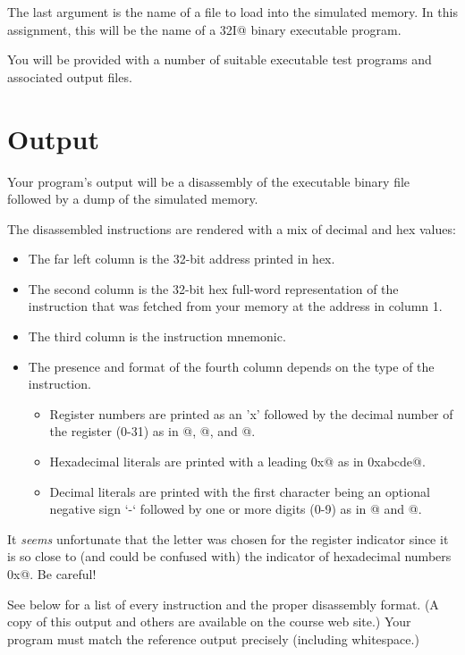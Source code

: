 \documentclass[11pt]{article}
\begin{document}
The last argument is the name of a file to load into the simulated memory. 
In this assignment, this will be the name of a \verb@RV32I@ binary executable 
program.

You will be provided with a number of suitable executable test programs and
associated output files.

\section{Output}

Your program's output will be a disassembly of the executable binary file
followed by a dump of the simulated memory.


The disassembled instructions are rendered with a mix of decimal and hex values:

\begin{itemize}
\item The far left column is the 32-bit address printed in hex.
\item The second column is the 32-bit hex full-word representation of the instruction 
that was fetched from your memory at the address in column 1.
\item The third column is the instruction mnemonic.
\item The presence and format of the fourth column depends on the type of the instruction.
\begin{itemize}
\item Register numbers are printed as an 'x' followed by the decimal number of the register (0-31)
	as in @, @, and @.
\item Hexadecimal literals are printed with a leading \verb@0x@ as in \verb@0xabcde@.
\item Decimal literals are printed with the first character being an optional
negative sign `-` followed by one or more digits (0-9) as in @ and @.
\end{itemize}
\end{itemize}

It {\em seems} unfortunate that the letter \verb@x@ was chosen for the register 
indicator since it is so close to (and could be confused with) the indicator of 
hexadecimal numbers \verb@0x@.  Be careful!

See below for a list of every instruction and the proper disassembly format. 
(A copy of this output and others are available on the course web site.)
Your program must match the reference output precisely (including whitespace.)
\end{document}
